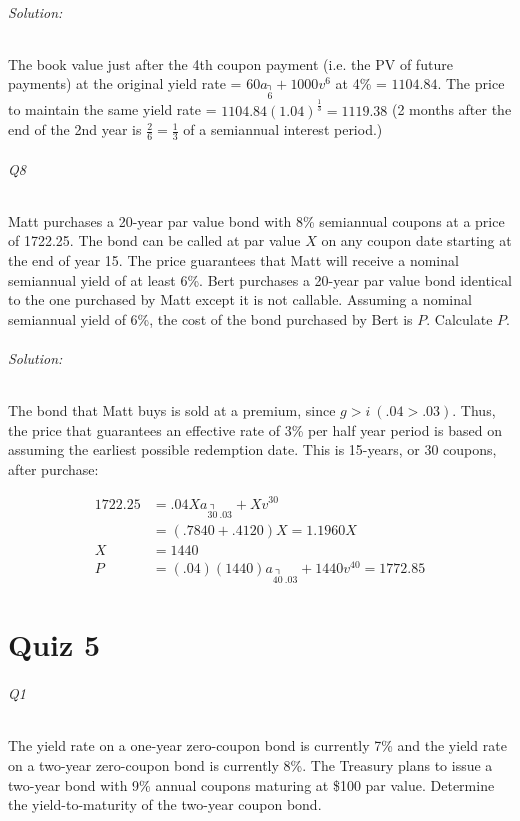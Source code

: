 \documentclass[a4paper, 11pt, twoside]{article}
\begin{document}
\paragraph{Solution:} The book value just after the 4th coupon payment (i.e. the PV of future payments) at the original yield rate = $60a_{\annuity{6}}+1000v^6$ at 4\% = $1104.84$. The price to maintain the same yield rate = $1104.84(1.04)^{\frac{1}{3}}=1119.38$ (2 months after the end of the 2nd year is $\frac{2}{6}=\frac{1}{3}$ of a semiannual interest period.)

\paragraph{Q8} Matt purchases a 20-year par value bond with 8\% semiannual coupons at a price of 1722.25. The bond can be called at par value $X$ on any coupon date starting at the end of year 15. The price guarantees that Matt will receive a nominal semiannual yield of at least 6\%. Bert purchases a 20-year par value bond identical to the one purchased by Matt except it is not callable. Assuming a nominal semiannual yield of 6\%, the cost of the bond purchased by Bert is $P$. Calculate $P$.

\paragraph{Solution:} The bond that Matt buys is sold at a premium, since $g > i\ (.04>.03)$. Thus, the price that guarantees an effective rate of 3\% per half year period is based on assuming the earliest possible redemption date. This is 15-years, or 30 coupons, after purchase:

\[\begin{split}
	1722.25&=.04Xa_{\annuity{30\ }.03} + Xv^{30}\\
	&=(.7840+.4120)X=1.1960X\\
	X&=1440\\
	P&=(.04)(1440)a_{\annuity{40\ }.03}+1440v^{40}=1772.85
\end{split}\]

\part{Quiz 5}

\paragraph{Q1} The yield rate on a one-year zero-coupon bond is currently 7\% and the yield rate on a two-year zero-coupon bond is currently 8\%. The Treasury plans to issue a two-year bond with 9\% annual coupons maturing at \$100 par value. Determine the yield-to-maturity of the two-year coupon bond.
\end{document}
